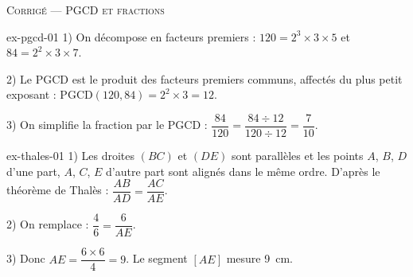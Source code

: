 \documentclass[11pt,a4paper]{article}
\begin{document}
\begin{center}
  {\Large \textsc{Corrigé — PGCD et fractions}}
\end{center}

\vspace{10pt}

\begin{askmecorrection}{ex-pgcd-01}
1) On décompose en facteurs premiers :
$120 = 2^3 \times 3 \times 5$ et $84 = 2^2 \times 3 \times 7$.

2) Le PGCD est le produit des facteurs premiers communs, affectés du plus
petit exposant : $\mathrm{PGCD}(120, 84) = 2^2 \times 3 = 12$.

3) On simplifie la fraction par le PGCD :
$\dfrac{84}{120} = \dfrac{84 \div 12}{120 \div 12} = \dfrac{7}{10}$.
\end{askmecorrection}

\begin{askmecorrection}{ex-thales-01}
1) Les droites $(BC)$ et $(DE)$ sont parallèles et les points $A$, $B$, $D$
d'une part, $A$, $C$, $E$ d'autre part sont alignés dans le même ordre.
D'après le théorème de Thalès : $\dfrac{AB}{AD} = \dfrac{AC}{AE}$.

2) On remplace : $\dfrac{4}{6} = \dfrac{6}{AE}$.

3) Donc $AE = \dfrac{6 \times 6}{4} = 9$. Le segment $[AE]$ mesure 9~cm.
\end{askmecorrection}
\end{document}
